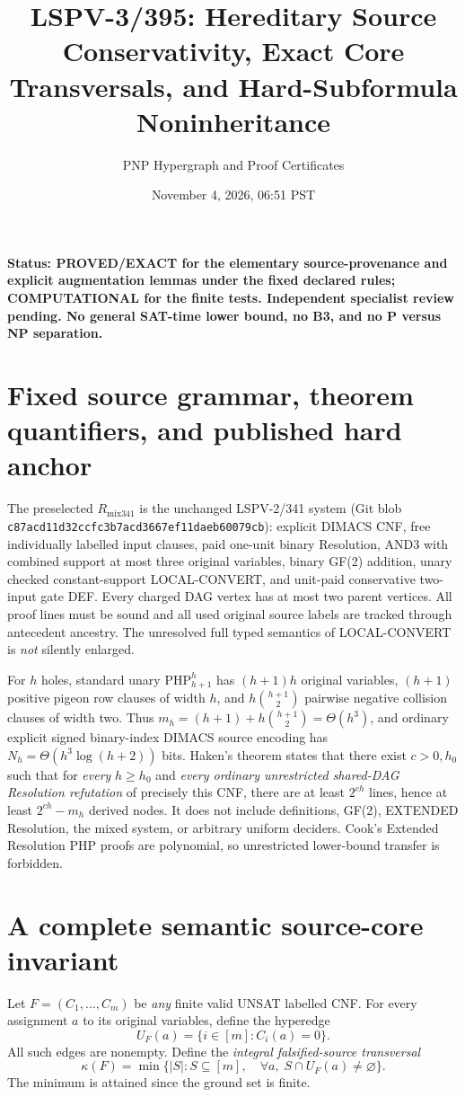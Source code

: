 \documentclass[11pt]{article}
\title{LSPV-3/395: Hereditary Source Conservativity, Exact Core Transversals, and Hard-Subformula Noninheritance}
\author{PNP Hypergraph and Proof Certificates}
\date{November 4, 2026, 06:51 PST}
\begin{document}
\maketitle
\noindent\textbf{Status: PROVED/EXACT for the elementary source-provenance and explicit augmentation lemmas under the fixed declared rules; COMPUTATIONAL for the finite tests. Independent specialist review pending. No general SAT-time lower bound, no B3, and no P versus NP separation.}

\section*{Fixed source grammar, theorem quantifiers, and published hard anchor}
The preselected $R_{\mathrm{mix341}}$ is the unchanged LSPV-2/341 system (Git blob \texttt{c87acd11d32ccfc3b7acd3667ef11daeb60079cb}): explicit DIMACS CNF, free individually labelled input clauses, paid one-unit binary Resolution, AND3 with combined support at most three original variables, binary GF(2) addition, unary checked constant-support LOCAL-CONVERT, and unit-paid conservative two-input gate DEF. Every charged DAG vertex has at most two parent vertices. All proof lines must be sound and all used original source labels are tracked through antecedent ancestry. The unresolved full typed semantics of LOCAL-CONVERT is \emph{not} silently enlarged.

For $h$ holes, standard unary $\mathrm{PHP}_{h+1}^{h}$ has $(h+1)h$ original variables, $(h+1)$ positive pigeon row clauses of width $h$, and $h\binom{h+1}{2}$ pairwise negative collision clauses of width two. Thus $m_h=(h+1)+h\binom{h+1}{2}=\Theta(h^3)$, and ordinary explicit signed binary-index DIMACS source encoding has $N_h=\Theta(h^3\log(h+2))$ bits. Haken's theorem states that there exist $c>0,h_0$ such that for \emph{every} $h\ge h_0$ and \emph{every ordinary unrestricted shared-DAG Resolution refutation} of precisely this CNF, there are at least $2^{ch}$ lines, hence at least $2^{ch}-m_h$ derived nodes. It does not include definitions, GF(2), EXTENDED Resolution, the mixed system, or arbitrary uniform deciders. Cook's Extended Resolution PHP proofs are polynomial, so unrestricted lower-bound transfer is forbidden.

\section*{A complete semantic source-core invariant}
Let $F=(C_1,\ldots,C_m)$ be \emph{any} finite valid UNSAT labelled CNF. For every assignment $a$ to its original variables, define the hyperedge
\[
U_F(a)=\{i\in[m]:C_i(a)=0\}.
\]
All such edges are nonempty. Define the \emph{integral falsified-source transversal}
\[
\kappa(F)=\min\{|S|:S\subseteq[m],\quad
                    \forall a,\;S\cap U_F(a)\ne\varnothing\}.
\]
The minimum is attained since the ground set is finite.
\end{document}
